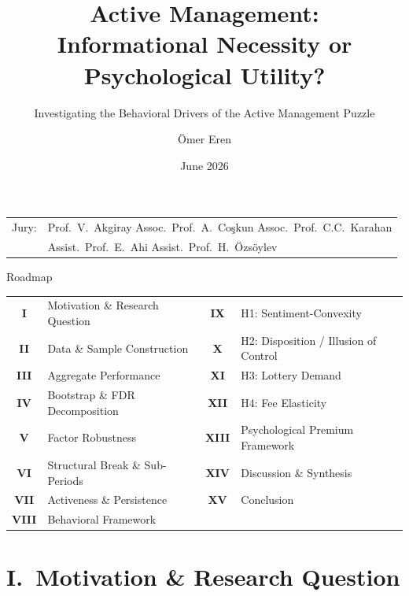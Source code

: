 \documentclass[10pt, aspectratio=169]{beamer}
\title{Active Management:\\[4pt]
       \normalsize Informational Necessity or Psychological Utility?}
\subtitle{Investigating the Behavioral Drivers of the Active Management Puzzle}
\author{Ömer Eren}
\institute{%
  Department of Management, Boğaziçi University\\[2pt]
  Supervisor: Prof.\ Vedat Akgiray}
\date{June 2026}
\begin{document}
{%
\begin{frame}
  \titlepage
  \vfill
  \footnotesize
  \begin{tabular}{@{}ll}
    Jury: & Prof.\ V.\ Akgiray \textbar{} Assoc.\ Prof.\ A.\ Coşkun \textbar{}
            Assoc.\ Prof.\ C.C.\ Karahan \\
          & Assist.\ Prof.\ E.\ Ahi \textbar{} Assist.\ Prof.\ H.\ Özsöylev
  \end{tabular}
\end{frame}
}

\begin{frame}{Roadmap}
\setlength{\tabcolsep}{6pt}
\footnotesize
\begin{tabular}{@{}cl@{\hspace{12pt}}cl}
  \textbf{I}    & Motivation \& Research Question  &
  \textbf{IX}   & H1: Sentiment-Convexity \\
  \textbf{II}   & Data \& Sample Construction      &
  \textbf{X}    & H2: Disposition / Illusion of Control \\
  \textbf{III}  & Aggregate Performance            &
  \textbf{XI}   & H3: Lottery Demand \\
  \textbf{IV}   & Bootstrap \& FDR Decomposition  &
  \textbf{XII}  & H4: Fee Elasticity \\
  \textbf{V}    & Factor Robustness                &
  \textbf{XIII} & Psychological Premium Framework \\
  \textbf{VI}   & Structural Break \& Sub-Periods  &
  \textbf{XIV}  & Discussion \& Synthesis \\
  \textbf{VII}  & Activeness \& Persistence        &
  \textbf{XV}   & Conclusion \\
  \textbf{VIII} & Behavioral Framework             & & \\
\end{tabular}
\end{frame}

\section{I.\ Motivation \& Research Question}
\end{document}
